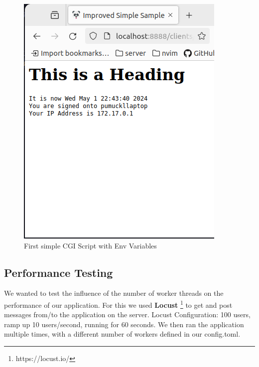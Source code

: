 \begin{figure}[h]
\begin{minipage}{0.35\textwidth}
        \includegraphics[width=\textwidth]{figures/cgi.png}
        \caption{First simple CGI Script with Env Variables}
    \end{minipage}
\end{figure}

\subsection*{Performance Testing}
We wanted to test the influence of the number of worker threads on the performance of our application. For this we used \textbf{Locust} \footnote{https://locust.io/} to get and post messages from/to the application on the server. Locust Configuration: 100 users, ramp up 10 users/second, running for 60 seconds. We then ran the application multiple times, with a different number of workers defined in our config.toml. 

